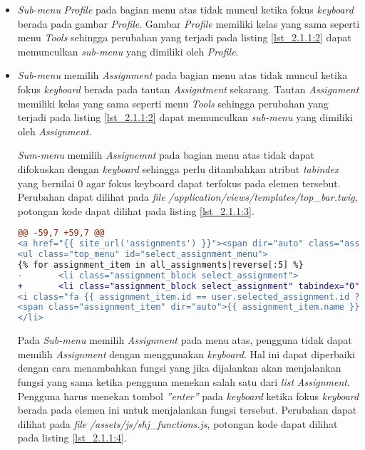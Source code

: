 \begin{itemize}
	\item \textit{Sub-menu} \textit{Profile} pada bagian menu atas tidak muncul ketika fokus \textit{keyboard} berada pada gambar \textit{Profile}. Gambar \textit{Profile} memiliki kelas yang sama seperti menu \textit{Tools} sehingga perubahan yang terjadi pada listing \ref{lst_2.1.1:2} dapat memunculkan \textit{sub-menu} yang dimiliki oleh \textit{Profile}.
	
	\item \textit{Sub-menu} memilih \textit{Assignment} pada bagian menu atas tidak muncul ketika fokus \textit{keyboard} berada pada tautan \textit{Assigntment} sekarang. Tautan \textit{Assignment} memiliki kelas yang sama seperti menu \textit{Tools} sehingga perubahan yang terjadi pada listing \ref{lst_2.1.1:2} dapat memunculkan \textit{sub-menu} yang dimiliki oleh \textit{Assignment}.
	
	\textit{Sum-menu} memilih \textit{Assignemnt} pada bagian menu atas tidak dapat difokuskan dengan \textit{keyboard} sehingga perlu ditambahkan atribut \textit{tabindex} yang bernilai 0 agar fokus keyboard dapat terfokus pada elemen tersebut. Perubahan dapat dilihat pada \textit{file} \textit{/application/views/templates/top\_bar.twig}, potongan kode dapat dilihat pada listing \ref{lst_2.1.1:3}.
	
\begin{lstlisting}[language=diff, caption=Perubahan pada \textit{file} \textit{top\_bar.twig}, label=lst_2.1.1:3, basicstyle=\ttfamily, frame=single,
columns=fullflexible, keepspaces=true, breaklines=true]
@@ -59,7 +59,7 @@
<a href="{{ site_url('assignments') }}"><span dir="auto" class="assignment_name">{{ user.selected_assignment.name|length > 30 ? user.selected_assignment.name|slice(0, 30) ~ '...' : user.selected_assignment.name }}</span></a>
<ul class="top_menu" id="select_assignment_menu">
{% for assignment_item in all_assignments|reverse[:5] %}
- 		<li class="assignment_block select_assignment">
+  		<li class="assignment_block select_assignment" tabindex="0">
<i class="fa {{ assignment_item.id == user.selected_assignment.id ? 'fa-check-square-o color6' : 'fa-square-o' }}" data-id="{{ assignment_item.id }}"></i>
<span class="assignment_item" dir="auto">{{ assignment_item.name }}</span>
</li>
\end{lstlisting}

	Pada \textit{Sub-menu} memilih \textit{Assignment} pada menu atas, pengguna tidak dapat memilih \textit{Assignment} dengan menggunakan \textit{keyboard}. Hal ini dapat diperbaiki dengan cara menambahkan fungsi yang jika dijalankan akan menjalankan fungsi yang sama ketika pengguna menekan salah satu dari \textit{list} \textit{Assignment}. Pengguna harus menekan tombol \textit{''enter''} pada \textit{keyboard} ketika fokus \textit{keyboard} berada pada elemen ini untuk menjalankan fungsi tersebut. Perubahan dapat dilihat pada \textit{file} \textit{/assets/js/shj\_functions.js}, potongan kode dapat dilihat pada listing \ref{lst_2.1.1:4}.
	

\end{itemize}
